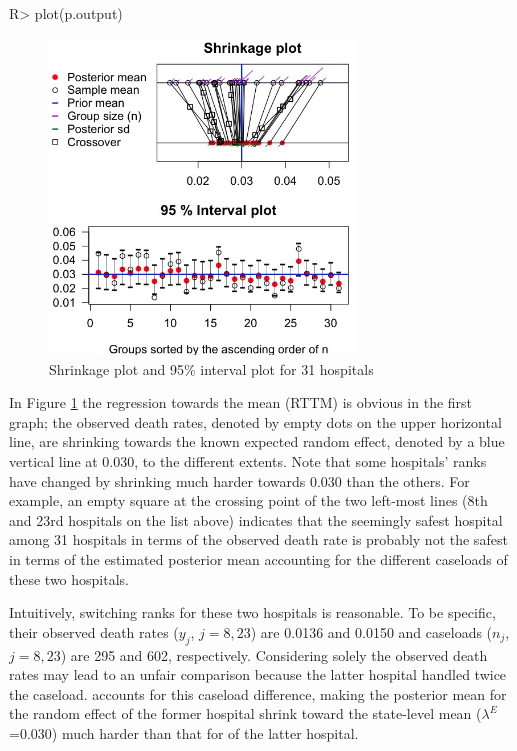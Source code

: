 \documentclass[article]{jss}
\begin{document}
\begin{CodeChunk}
\begin{CodeInput}
R> plot(p.output)
\end{CodeInput}
\end{CodeChunk}
\begin{figure}[h]
\begin{center}
\includegraphics[width = 3.2in]{hospital1.png}
\caption{Shrinkage plot and 95\% interval plot for 31 hospitals}
\label{fig:hospshr}
\end{center}
\end{figure}

In Figure \ref{fig:hospshr} the regression towards the mean (RTTM) is obvious in the first graph; the observed death rates, denoted by empty dots on the upper horizontal line, are shrinking towards the known expected random effect, denoted by a blue vertical line at 0.030, to the different extents. Note that some hospitals' ranks have changed by shrinking much harder towards 0.030 than the others. For example, an empty square at the crossing point of the two left-most lines (8th and 23rd hospitals on the list above) indicates that  the seemingly safest hospital among 31 hospitals in terms of the observed death rate is probably not the safest in terms of the estimated posterior mean accounting for the different caseloads of these two hospitals. 


Intuitively, switching ranks for these two hospitals is reasonable. To be specific, their observed death rates ($y_{j}$, $j=8, 23$) are 0.0136 and 0.0150 and caseloads ($n_{j}$, $j=8, 23$) are 295 and 602, respectively. Considering solely the observed death rates may lead to an unfair comparison because the latter hospital handled twice the caseload.  accounts for this caseload difference, making the posterior mean for the random effect of the former hospital shrink toward the state-level mean ($\lambda^E$=0.030) much harder than that for of the latter hospital.
\end{document}

